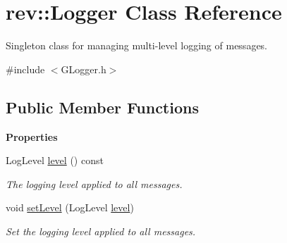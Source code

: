 \hypertarget{classrev_1_1_logger}{}\section{rev\+::Logger Class Reference}
\label{classrev_1_1_logger}


Singleton class for managing multi-\/level logging of messages.  




{\ttfamily \#include $<$G\+Logger.\+h$>$}

\subsection*{Public Member Functions}
\begin{Indent}\textbf{ Properties}\par
\begin{DoxyCompactItemize}
\item 
Log\+Level \mbox{\hyperlink{classrev_1_1_logger_a9fb93878a5b8e3e9367078a1446128b2}{level}} () const
\begin{DoxyCompactList}\small\item\em The logging level applied to all messages. \end{DoxyCompactList}\item 
void \mbox{\hyperlink{classrev_1_1_logger_a142e9c560c576f0fe3146db86a458a17}{set\+Level}} (Log\+Level \mbox{\hyperlink{classrev_1_1_logger_a9fb93878a5b8e3e9367078a1446128b2}{level}})
\begin{DoxyCompactList}\small\item\em Set the logging level applied to all messages. \end{DoxyCompactList}\end{DoxyCompactItemize}
\end{Indent}
